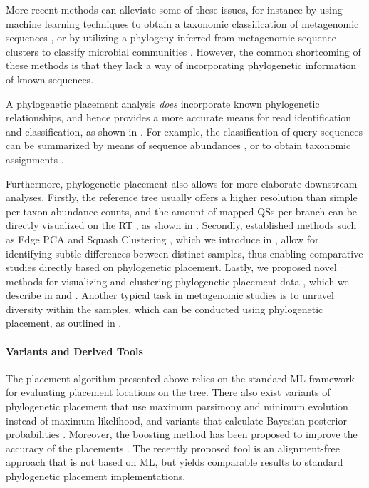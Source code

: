 More recent methods can alleviate some of these issues, for instance by
using machine learning techniques to obtain a taxonomic classification of metagenomic sequences \cite{Vervier2015},
or by utilizing a phylogeny inferred from metagenomic sequence clusters to classify microbial communities \cite{Tanaseichuk2014}.
However, the common shortcoming of these methods is
that they lack a way of incorporating phylogenetic information of known sequences.

A phylogenetic placement analysis \emph{does} incorporate known phylogenetic relationships,
and hence provides a more accurate means for read identification and classification,
as shown in .
For example, the classification of query sequences
can be summarized by means of sequence abundances \cite{Pace1997,Hugenholtz1998},
or to obtain taxonomic assignments \cite{Kozlov2016}.

Furthermore, phylogenetic placement also allows for more elaborate downstream analyses.
Firstly, the reference tree usually offers a higher resolution than simple per-taxon abundance counts,
and the amount of mapped \acp{QS} per branch can be directly visualized on the \ac{RT} \citep{Mahe2017},
as shown in .
Secondly, established methods such as Edge PCA and Squash Clustering \citep{Matsen2011a},
which we introduce in ,
allow for identifying subtle differences between distinct samples,
thus enabling comparative studies directly based on phylogenetic placement.
Lastly, we proposed novel methods for visualizing and clustering phylogenetic placement data \citep{Czech2018a},
which we describe in  and .
Another typical task in metagenomic studies is to unravel diversity within the samples,
which can be conducted using phylogenetic placement, as outlined in .

\paragraph{Variants and Derived Tools}
\label{ch:Foundations:sec:PhylogeneticPlacement:sub:UseCasesApplications:par:DerivedTools}

The placement algorithm presented above relies on the standard ML framework for evaluating placement locations on the tree.
There also exist variants of phylogenetic placement that use maximum parsimony \cite{Berger2011}
and minimum evolution \cite{Filipski2015} instead of maximum likelihood,
and variants that calculate Bayesian posterior probabilities \cite{Matsen2010}.
Moreover, the boosting method  has been proposed to improve the accuracy of the placements \cite{Mirarab2012}.
The recently proposed tool  \cite{Linard2018} is an alignment-free approach
that is not based on ML, but yields comparable results to standard phylogenetic placement implementations.

